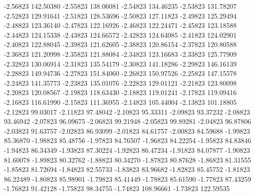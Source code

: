      -2.56823    142.50380    
     -2.55823    138.06081    
     -2.54823    134.46235    
     -2.53823    131.78207    
     -2.52823    129.91641    
     -2.51823    128.53696    
     -2.50823    127.11823    
     -2.49823    125.29494    
     -2.48823    123.36140    
     -2.47823    122.16926    
     -2.46823    122.24471    
     -2.45823    123.18588    
     -2.44823    124.15338    
     -2.43823    124.66572    
     -2.42823    124.64085    
     -2.41823    124.02901    
     -2.40823    122.88045    
     -2.39823    121.62605    
     -2.38823    120.86154    
     -2.37823    120.80588    
     -2.36823    121.20998    
     -2.35823    121.88084    
     -2.34823    123.16683    
     -2.33823    125.77909    
     -2.32823    130.06914    
     -2.31823    135.54179    
     -2.30823    141.18286    
     -2.29823    146.16139    
     -2.28823    149.94736    
     -2.27823    151.84060    
     -2.26823    150.97526    
     -2.25823    147.15578    
     -2.24823    141.35773    
     -2.23823    135.01076    
     -2.22823    129.01121    
     -2.21823    123.80098    
     -2.20823    120.08567    
     -2.19823    118.63430    
     -2.18823    119.01241    
     -2.17823    119.09416    
     -2.16823    116.61990    
     -2.15823    111.36955    
     -2.14823    105.44004    
     -2.13823    101.18805    
     -2.12823     99.03017    
     -2.11823     97.48042    
     -2.10823     95.33311    
     -2.09823     93.37232    
     -2.08823     93.46942    
     -2.07823     96.09675    
     -2.06823     99.21948    
     -2.05823     99.89281    
     -2.04823     96.87806    
     -2.03823     91.63757    
     -2.02823     86.93099    
     -2.01823     84.61757    
     -2.00823     84.59688    
     -1.99823     85.36870    
     -1.98823     85.48756    
     -1.97823     84.76507    
     -1.96823     84.22254    
     -1.95823     84.83846    
     -1.94823     86.34349    
     -1.93823     87.30224    
     -1.92823     86.47234    
     -1.91823     84.07877    
     -1.90823     81.60078    
     -1.89823     80.32762    
     -1.88823     80.34270    
     -1.87823     80.87628    
     -1.86823     81.31555    
     -1.85823     81.72694    
     -1.84823     82.55733    
     -1.83823     83.96682    
     -1.82823     85.45752    
     -1.81823     86.22489    
     -1.80823     85.98901    
     -1.79823     85.41449    
     -1.78823     85.61590    
     -1.77823     87.43259    
     -1.76823     91.42128    
     -1.75823     98.34755    
     -1.74823    108.96661    
     -1.73823    122.59535    
